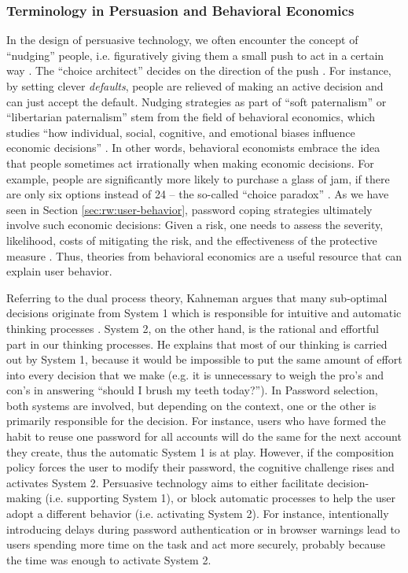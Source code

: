 	\subsubsection{Terminology in Persuasion and Behavioral Economics}
	In the design of persuasive technology, we often encounter the concept of ``nudging'' people, i.e. figuratively giving them a small push to act in a certain way \cite{Thaler2008Nudge}. The ``choice architect'' decides on the direction of the push \cite{Thaler2010ChoiceArchitecture}. For instance, by setting clever \textit{defaults}, people are relieved of making an active decision and can just accept the default. Nudging strategies as part of ``soft paternalism'' or ``libertarian paternalism'' stem from the field of behavioral economics, which studies ``how individual, social, cognitive, and emotional biases influence economic decisions'' \cite{Acquisti2008DigitalPrivacy}. In other words, behavioral economists embrace the idea that people sometimes act irrationally when making economic decisions. For example, people are significantly more likely to purchase a glass of jam, if there are only six options instead of 24 -- the so-called ``choice paradox'' \cite{Iyengar2000WhenChoiceIsDemotivating}. As we have seen in Section \ref{sec:rw:user-behavior}, password coping strategies ultimately involve such economic decisions: Given a risk, one needs to assess the severity, likelihood, costs of mitigating the risk, and the effectiveness of the protective measure \cite{Schneier2008PsychologySecurity}. Thus, theories from behavioral economics are a useful resource that can explain user behavior. 
	
	Referring to the dual process theory, Kahneman argues that many sub-optimal decisions originate from System 1 which is responsible for intuitive and automatic thinking processes \cite{Kahnemann2002}. System 2, on the other hand, is the rational and effortful part in our thinking processes. He explains that most of our thinking is carried out by System 1, because it would be impossible to put the same amount of effort into every decision that we make (e.g. it is unnecessary to weigh the pro's and con's in answering ``should I brush my teeth today?'').  In Password selection, both systems are involved, but depending on the context, one or the other is primarily responsible for the decision. For instance, users who have formed the habit to reuse one password for all accounts will do the same for the next account they create, thus the automatic System 1 is at play. However, if the composition policy forces the user to modify their password, the cognitive challenge rises and activates System 2. Persuasive technology aims to either facilitate decision-making (i.e. supporting System 1), or block automatic processes to help the user adopt a different behavior (i.e. activating System 2). For instance, intentionally introducing delays during password authentication \cite{Malkin2013Waiting} or in browser warnings \cite{Egelman2010PleaseContinueToHold} lead to users spending more time on the task and act more securely, probably because the time was enough to activate System 2.  

